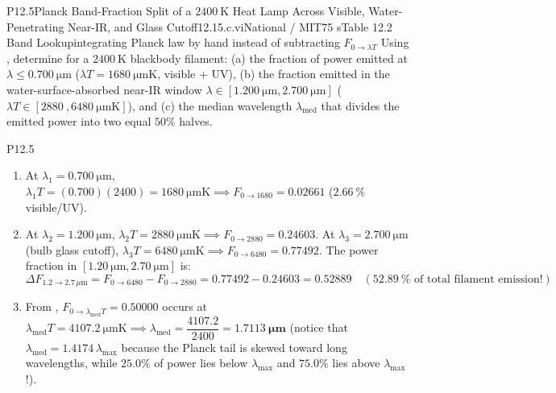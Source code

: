 \begin{problem}{P12.5}{Planck Band-Fraction Split of a $\SI{2400}{\kelvin}$ Heat Lamp Across Visible, Water-Penetrating Near-IR, and Glass Cutoff}{12.1}{5.c.vi}{National / MIT}{75 s}{Table 12.2 Band Lookup}{integrating Planck law by hand instead of subtracting $F_{0\to\lambda T}$}
Using , determine for a $\SI{2400}{\kelvin}$ blackbody filament: (a) the fraction of power emitted at $\lambda \le \SI{0.700}{\micro\meter}$ ($\lambda T = \SI{1680}{\micro\meter\kelvin}$, visible + UV), (b) the fraction emitted in the water-surface-absorbed near-IR window $\lambda \in [\SI{1.200}{\micro\meter}, \SI{2.700}{\micro\meter}]$ ($\lambda T \in [\SI{2880}{}, \SI{6480}{\micro\meter\kelvin}]$), and (c) the median wavelength $\lambda_{\mathrm{med}}$ that divides the emitted power into two equal $50\%$ halves.
\end{problem}
\begin{solution}{P12.5}
\begin{enumerate}
  \item[(a)] At $\lambda_1 = \SI{0.700}{\micro\meter}$, $\lambda_1 T = (0.700)(2400) = \SI{1680}{\micro\meter\kelvin} \implies F_{0\to 1680} = \mathbf{0.02661}$ ($\mathbf{\SI{2.66}{\percent}}$ visible/UV).
  \item[(b)] At $\lambda_2 = \SI{1.200}{\micro\meter}$, $\lambda_2 T = \SI{2880}{\micro\meter\kelvin} \implies F_{0\to 2880} = 0.24603$. At $\lambda_3 = \SI{2.700}{\micro\meter}$ (bulb glass cutoff), $\lambda_3 T = \SI{6480}{\micro\meter\kelvin} \implies F_{0\to 6480} = 0.77492$. The power fraction in $[\SI{1.20}{\micro\meter}, \SI{2.70}{\micro\meter}]$ is:
  \[
    \Delta F_{1.2\to 2.7\,\mu\mathrm{m}} = F_{0\to 6480} - F_{0\to 2880} = 0.77492 - 0.24603 = \mathbf{0.52889} \quad (\mathbf{\SI{52.89}{\percent}}\text{ of total filament emission!})
  \]
  \item[(c)] From , $F_{0\to\lambda_{\mathrm{med}} T} = 0.50000$ occurs at $\lambda_{\mathrm{med}} T = \SI{4107.2}{\micro\meter\kelvin} \implies \lambda_{\mathrm{med}} = \dfrac{4107.2}{2400} = \mathbf{\SI{1.7113}{\micro\meter}}$ (notice that $\lambda_{\mathrm{med}} = 1.4174\,\lambda_{\max}$ because the Planck tail is skewed toward long wavelengths, while $25.0\%$ of power lies below $\lambda_{\max}$ and $75.0\%$ lies above $\lambda_{\max}$!).
\end{enumerate}
\end{solution}

